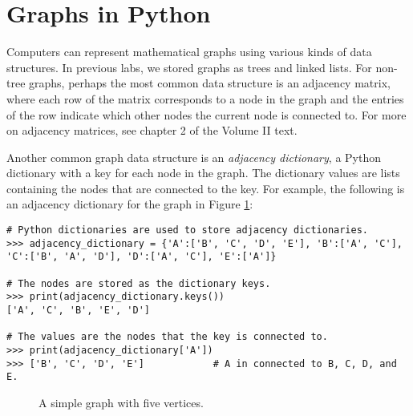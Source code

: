 \label{lab:SixDegreesKevinBacon}


\section*{Graphs in Python}

Computers can represent mathematical graphs using various kinds of data structures.
In previous labs, we stored graphs as trees and linked lists.
For non-tree graphs, perhaps the most common data structure is an adjacency matrix, where each row of the matrix corresponds to a node in the graph and the entries of the row indicate which other nodes the current node is connected to.
For more on adjacency matrices, see chapter 2 of the Volume II text.

Another common graph data structure is an \emph{adjacency dictionary}, a Python dictionary with a key for each node in the graph.
The dictionary values are lists containing the nodes that are connected to the key.
For example, the following is an adjacency dictionary for the graph in Figure \ref{fig:simple_graph}:

\begin{lstlisting}
# Python dictionaries are used to store adjacency dictionaries.
>>> adjacency_dictionary = {'A':['B', 'C', 'D', 'E'], 'B':['A', 'C'],
'C':['B', 'A', 'D'], 'D':['A', 'C'], 'E':['A']}

# The nodes are stored as the dictionary keys.
>>> print(adjacency_dictionary.keys())
['A', 'C', 'B', 'E', 'D']

# The values are the nodes that the key is connected to.
>>> print(adjacency_dictionary['A'])
>>> ['B', 'C', 'D', 'E']            # A in connected to B, C, D, and E.
\end{lstlisting}

\begin{figure}
\centering
{}
\caption{A simple graph with five vertices.}
\label{fig:simple_graph}
\end{figure}

